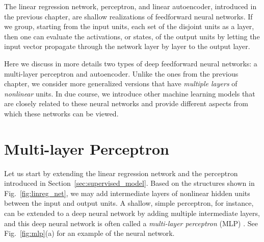\documentclass[dissertation,nocontribution,draft*]{aaltoseries}
\begin{document}
The linear regression network, perceptron, and linear
autoencoder, introduced in the previous chapter, are shallow
realizations of feedforward neural networks.  If we group,
starting from the input units, each set of the disjoint
units as a layer, then one can evaluate the activations, or
states, of the output units by letting the input vector
propagate through the network layer by layer to the output
layer.

Here we discuss in more details two types of deep
feedforward neural networks: a multi-layer
perceptron and autoencoder. Unlike the ones from the
previous chapter, we consider more generalized versions that
have \textit{multiple layers} of \textit{nonlinear} units.
In due course, we introduce other machine learning models
that are closely related to these neural networks and
provide different aspects from which these networks can be
viewed.

\section{Multi-layer Perceptron}
\label{sec:mlp}

Let us start by extending the linear regression network and
the
perceptron introduced in Section~\ref{sec:supervised_model}.
Based on the structures shown in Fig.~\ref{fig:linreg_net},
we may add intermediate layers of nonlinear hidden units
between the input and output units. A shallow, simple
perceptron, for instance, can be extended to a deep neural
network by adding multiple intermediate layers, and this
deep neural network is often called a \textit{multi-layer
perceptron} (MLP) \citep[see, e.g.,][and references
therein]{Haykin2009}. See Fig.~\ref{fig:mlp}(a) for an
example of the neural network.
\end{document}
